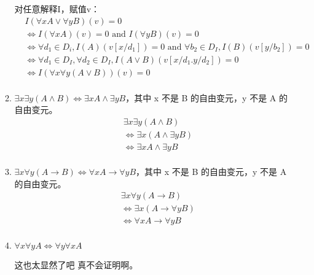 \documentclass[UTF8]{ctexart}
\begin{document}
\begin{enumerate}
\begin{enumerate}
            对任意解释I，赋值v：
            \[
                \begin{aligned}
                    &I(\forall xA\vee \forall yB)(v)=0\\
                    &\Leftrightarrow I(\forall xA)(v)=0\text{ and }I(\forall yB)(v)=0\\
                    &\Leftrightarrow \forall d_1\in D_i,I(A)(v[x/d_1])=0\text{ and }\forall b_2\in D_I,I(B)(v[y/b_2])=0\\
                    &\Leftrightarrow \forall d_1\in D_I,\forall d_2\in D_I,I(A\vee B)(v[x/d_1.y/d_2])=0\\
                    &\Leftrightarrow I(\forall x\forall y(A\vee B))(v)=0\\
                \end{aligned}
            \]
            \item $\exists x\exists y(A\wedge B)\Leftrightarrow \exists xA\wedge \exists yB$，其中 x 不是 B 的自由变元，y 不是 A 的自由变元。
            \[
                \begin{aligned}
                    &\exists x\exists y(A\wedge B)\\
                    &\Leftrightarrow \exists x(A\wedge \exists yB)\\
                    &\Leftrightarrow \exists xA \wedge \exists yB\\
                \end{aligned}
            \]
            
            \item $\exists x\forall y(A\rightarrow B)\Leftrightarrow \forall xA\rightarrow \forall yB$，其中 x 不是 B 的自由变元，y 不是 A 的自由变元。
            \[
                \begin{aligned}
                    &\exists x\forall y(A\rightarrow  B)\\
                    &\Leftrightarrow \exists x(A\rightarrow \forall yB)\\
                    &\Leftrightarrow \forall xA\rightarrow \forall yB\\
                \end{aligned}
            \]

            \item $\forall x\forall yA\Leftrightarrow \forall y\forall xA$
            
            这也太显然了吧 真不会证明啊。
        \end{enumerate}
    \end{enumerate}
\end{document}
